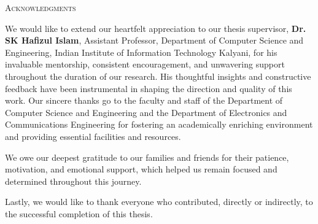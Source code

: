 \vspace*{0.1cm}
\begin{center}
    {\LARGE \textsc{Acknowledgments}}
\end{center}
\vspace{0.3cm}


We would like to extend our heartfelt appreciation to our thesis supervisor, 
\textbf{Dr. SK Hafizul Islam}, Assistant Professor, Department of Computer Science and Engineering, 
Indian Institute of Information Technology Kalyani, for his invaluable mentorship, consistent encouragement, 
and unwavering support throughout the duration of our research. His thoughtful insights and constructive feedback 
have been instrumental in shaping the direction and quality of this work.
Our sincere thanks go to the faculty and staff of the Department of Computer Science and Engineering and the 
Department of Electronics and Communications Engineering for fostering an academically enriching environment 
and providing essential facilities and resources.

We owe our deepest gratitude to our families and friends for their patience, motivation, 
and emotional support, which helped us remain focused and determined throughout this journey.

Lastly, we would like to thank everyone who contributed, directly or indirectly, to the successful completion 
of this thesis.

\vspace{1in}

